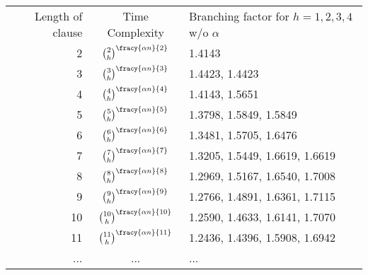 \documentclass{article}
\begin{document}
\begin{table}[t]
\begin{center}
\begin{tabular}{ |r|c|l| } 
\hline
Length of clause & Time Complexity & Branching factor for $h=1,2,3,4$ w/o $\alpha$ \\
2 &   $\binom{2}{h}^{\fracy{\alpha n}{2}}$  & 1.4143 \\ 
3 &   $\binom{3}{h}^{\fracy{\alpha n}{3}}$  & 1.4423, 1.4423 \\ 
4 &   $\binom{4}{h}^{\fracy{\alpha n}{4}}$  & 1.4143, 1.5651 \\ 
5 &   $\binom{5}{h}^{\fracy{\alpha n}{5}}$  & 1.3798, 1.5849, 1.5849 \\
6 &   $\binom{6}{h}^{\fracy{\alpha n}{6}}$  & 1.3481, 1.5705, 1.6476 \\ 
7 &   $\binom{7}{h}^{\fracy{\alpha n}{7}}$  & 1.3205, 1.5449, 1.6619, 1.6619 \\ 
8 &   $\binom{8}{h}^{\fracy{\alpha n}{8}}$  & 1.2969, 1.5167, 1.6540, 1.7008 \\ 
9 &   $\binom{9}{h}^{\fracy{\alpha n}{9}}$  & 1.2766, 1.4891, 1.6361, 1.7115 \\ 
10 & $\binom{10}{h}^{\fracy{\alpha n}{10}}$  & 1.2590, 1.4633, 1.6141, 1.7070 \\ 
11 & $\binom{11}{h}^{\fracy{\alpha n}{11}}$  & 1.2436, 1.4396, 1.5908, 1.6942 \\ 
... & ...  & ... \\   
\hline
\end{tabular}
\end{center}
\end{table}
\end{document}
